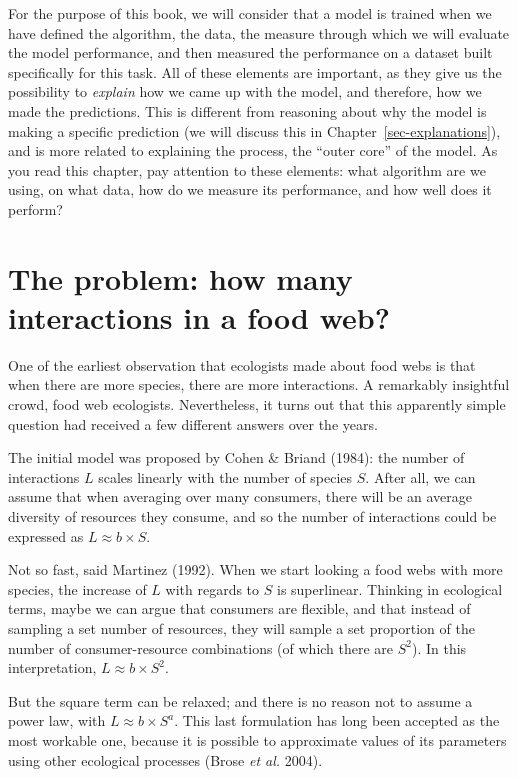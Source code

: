 \documentclass[
  letterpaper,
]{scrbook}
\begin{document}
For the purpose of this book, we will consider that a model is trained
when we have defined the algorithm, the data, the measure through which
we will evaluate the model performance, and then measured the
performance on a dataset built specifically for this task. All of these
elements are important, as they give us the possibility to
\emph{explain} how we came up with the model, and therefore, how we made
the predictions. This is different from reasoning about why the model is
making a specific prediction (we will discuss this in
Chapter~\ref{sec-explanations}), and is more related to explaining the
process, the ``outer core'' of the model. As you read this chapter, pay
attention to these elements: what algorithm are we using, on what data,
how do we measure its performance, and how well does it perform?

\section{The problem: how many interactions in a food
web?}\label{sec-gradientdescent-problem}

One of the earliest observation that ecologists made about food webs is
that when there are more species, there are more interactions. A
remarkably insightful crowd, food web ecologists. Nevertheless, it turns
out that this apparently simple question had received a few different
answers over the years.

The initial model was proposed by Cohen \& Briand (1984): the number of
interactions \(L\) scales linearly with the number of species \(S\).
After all, we can assume that when averaging over many consumers, there
will be an average diversity of resources they consume, and so the
number of interactions could be expressed as \(L \approx b\times S\).

Not so fast, said Martinez (1992). When we start looking a food webs
with more species, the increase of \(L\) with regards to \(S\) is
superlinear. Thinking in ecological terms, maybe we can argue that
consumers are flexible, and that instead of sampling a set number of
resources, they will sample a set proportion of the number of
consumer-resource combinations (of which there are \(S^2\)). In this
interpretation, \(L \approx b\times S^2\).

But the square term can be relaxed; and there is no reason not to assume
a power law, with \(L\approx b\times S^a\). This last formulation has
long been accepted as the most workable one, because it is possible to
approximate values of its parameters using other ecological processes
(Brose \emph{et al.} 2004).
\end{document}
